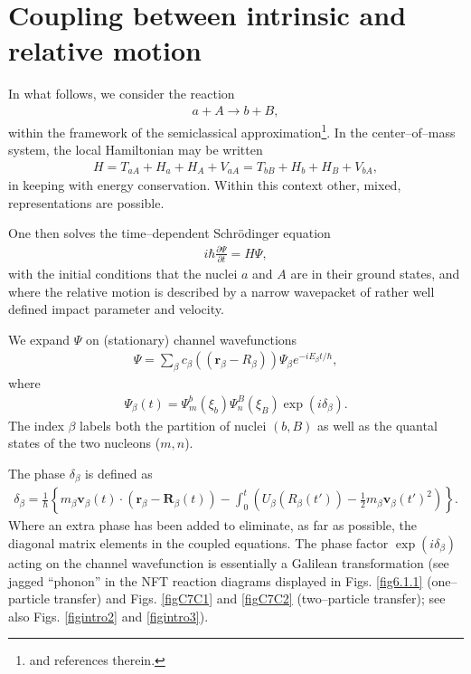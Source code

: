 \section{Coupling between intrinsic and relative motion}\label{appintroB}
In what follows, we consider the reaction
\begin{align}
a+A\rightarrow b+B,
\end{align}
within the framework of the semiclassical approximation\footnote{\cite{Broglia:04a} and references therein.}.
In the center--of--mass system, the local Hamiltonian may be written
\begin{align}\label{eqintroB2}
H=T_{aA}+H_a+H_A+V_{aA}=T_{bB}+H_b+H_B+V_{bA},
\end{align}
in keeping with energy conservation. Within this context other, mixed, representations are possible.

One then solves the time--dependent Schr\"odinger equation 
\begin{align}
i\hbar\frac{\partial \Psi}{\partial t}=H\Psi,
\end{align}
with the initial conditions that the nuclei $a$ and $A$ are in their ground states, and where the relative motion is described by a narrow wavepacket of rather well defined impact parameter and velocity.


We expand $\Psi$ on (stationary) channel wavefunctions 
\begin{align}
\Psi=\sum_{\beta}c_\beta\left(\left(\mathbf r_\beta-R_\beta\right)\right)\Psi_\beta e^{-iE_\beta t/\hbar},
\end{align}
where
\begin{align}
\Psi_\beta (t)=\Psi_m^b(\xi_b)\Psi_n^B(\xi_B)\exp(i\delta_\beta).
\end{align}
The index $\beta$ labels both the partition of nuclei $(b,B)$ as well as the quantal states of the two nucleons ($m,n$).


The phase $\delta_\beta$ is defined as
\begin{align}
\delta_\beta=\frac{1}{\hbar}\left\{m_\beta \mathbf v_\beta(t)\cdot \left(\mathbf r_\beta-\mathbf R_\beta(t)\right)-\int_0^t\left(U_\beta\left(R_\beta(t')\right)-\frac{1}{2}m_\beta\mathbf v_\beta(t')^2\right)\right\}.
\end{align}
 Where an extra phase has been added to eliminate, as far as possible, the diagonal matrix elements in the coupled equations.
The phase factor $\exp(i\delta_\beta)$ acting on the channel wavefunction is essentially a Galilean transformation (see jagged ``phonon'' in the NFT reaction diagrams displayed in Figs. \ref{fig6.1.1} (one--particle transfer) and Figs. \ref{figC7C1} and \ref{figC7C2} (two--particle transfer); see also Figs. \ref{figintro2} and \ref{figintro3}).



